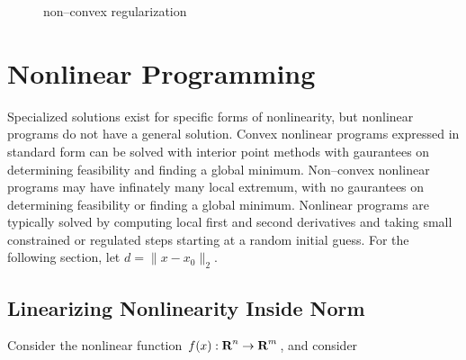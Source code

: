 \documentclass{article}
\begin{document}
    \begin{figure}[b!]
        \centering
        \qquad
        \caption{non--convex regularization}
    \end{figure}

\clearpage 

\section{Nonlinear Programming}

    Specialized solutions exist for specific forms of nonlinearity, but
    nonlinear programs do not have a general solution.  Convex nonlinear programs
    expressed in standard form can be solved with interior point methods
    with gaurantees on determining feasibility and finding a global minimum.
    Non--convex nonlinear programs may have infinately many local extremum,
    with no gaurantees on determining feasibility or finding a global minimum.
    Nonlinear programs are typically solved by computing local first and second derivatives
    and taking small constrained or regulated steps starting at a random initial guess.
    For the following section, let $d=\|x-x_0\|_2$.

\subsection{Linearizing Nonlinearity Inside Norm}

    Consider the nonlinear function $f(x):\textbf{R}^n\to\textbf{R}^m$, and consider
\end{document}
